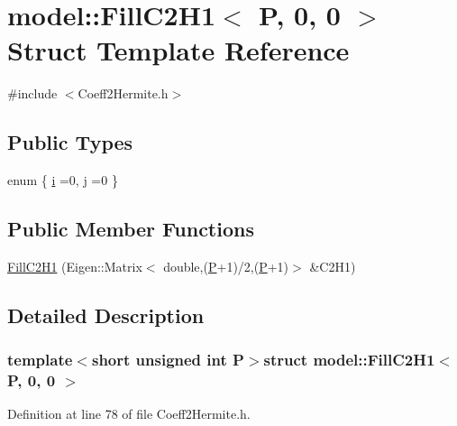\hypertarget{structmodel_1_1_fill_c2_h1_3_01_p_00_010_00_010_01_4}{}\section{model\+:\+:Fill\+C2\+H1$<$ P, 0, 0 $>$ Struct Template Reference}
\label{structmodel_1_1_fill_c2_h1_3_01_p_00_010_00_010_01_4}


{\ttfamily \#include $<$Coeff2\+Hermite.\+h$>$}

\subsection*{Public Types}
\begin{DoxyCompactItemize}
\item 
enum \{ \hyperlink{structmodel_1_1_fill_c2_h1_3_01_p_00_010_00_010_01_4_a3943de533a2541433ade3286523259edad84a114ec724e5fdb7c39a65dfcc4e02}{i} =0, 
\hyperlink{structmodel_1_1_fill_c2_h1_3_01_p_00_010_00_010_01_4_a3943de533a2541433ade3286523259eda604232d60902d5e8b9499c2673128741}{j} =0
 \}
\end{DoxyCompactItemize}
\subsection*{Public Member Functions}
\begin{DoxyCompactItemize}
\item 
\hyperlink{structmodel_1_1_fill_c2_h1_3_01_p_00_010_00_010_01_4_a1e946f5929c2951a6f3e9ab275b9499c}{Fill\+C2\+H1} (Eigen\+::\+Matrix$<$ double,(\hyperlink{_f_e_m_2linear__elasticity__3d_2tetgen_2generate_p_o_l_ycube_8m_a50a9afb44201a65ab7ad5feb2150aeb6}{P}+1)/2,(\hyperlink{_f_e_m_2linear__elasticity__3d_2tetgen_2generate_p_o_l_ycube_8m_a50a9afb44201a65ab7ad5feb2150aeb6}{P}+1)$>$ \&C2\+H1)
\end{DoxyCompactItemize}


\subsection{Detailed Description}
\subsubsection*{template$<$short unsigned int P$>$struct model\+::\+Fill\+C2\+H1$<$ P, 0, 0 $>$}



Definition at line 78 of file Coeff2\+Hermite.\+h.



